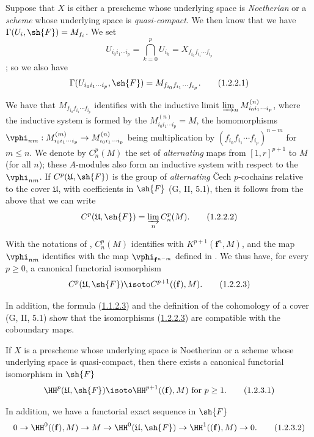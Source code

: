 \begin{env}[1.2.2]
\label{III.1.2.2}
Suppose that $X$ is either a prescheme whose underlying space is \emph{Noetherian} or a \emph{scheme} whose underlying space is \emph{quasi-compact}.
We then know  that we have $\Gamma(U_i,\sh{F})=M_{f_i}$.
We set
\[
  U_{i_0 i_1\cdots i_p}=\bigcap_{k=0}^p U_{i_k}=X_{f_{i_0}f_{i_1}\cdots f_{i_p}}
\]
; so we also have
\[
  \Gamma(U_{i_0 i_1\cdots i_p},\sh{F})=M_{f_{i_0}f_{i_1}\cdots f_{i_p}}.
  \tag{1.2.2.1}
\]

We have  that $M_{f_{i_0}f_{i_1}\cdots f_{i_p}}$ identifies with the inductive limit $\varinjlim_n M_{i_0 i_1\cdots i_p}^{(n)}$, where the inductive system is formed by the $M_{i_0 i_1\cdots i_p}^{(n)}=M$, the homomorphisms $\vphi_{nm}:M_{i_0 i_1\cdots i_p}^{(m)}\to M_{i_0 i_1\cdots i_p}^{(n)}$ being multiplication by $(f_{i_0}f_{i_1}\cdots f_{i_p})^{n-m}$ for $m\leq n$.
We denote by $C_n^p(M)$ the set of \emph{alternating} maps from $[1,r]^{p+1}$ to $M$ (for all $n$); these $A$-modules also form an inductive system with respect to the $\vphi_{nm}$.
If $C^p(\mathfrak{U},\sh{F})$ is the group of \emph{alternating} \v Cech $p$-cochains relative to the cover $\mathfrak{U}$, with coefficients in $\sh{F}$ (G, II, 5.1), then it follows from the above that we can write
\[
  C^p(\mathfrak{U},\sh{F})=\varinjlim_n C_n^p(M).
  \tag{1.2.2.2}
\]

With the notations of , $C_n^p(M)$ identifies with $K^{p+1}(\mathbf{f}^n,M)$, and the map $\vphi_{nm}$ identifies with the map $\vphi_{\mathbf{f}^{n-m}}$ defined in .
We thus have, for every $p\geq 0$, a canonical functorial isomorphism
\[
  C^p(\mathfrak{U},\sh{F})\isoto C^{p+1}((\mathbf{f}),M).
  \tag{1.2.2.3}\label{III.1.2.2.3}
\]

In addition, the formula (\hyperref[III.1.1.2.3]{1.1.2.3}) and the definition of the cohomology of a cover (G, II, 5.1) show that the isomorphisms (\hyperref[III.1.2.2.3]{1.2.2.3}) are compatible with the coboundary maps.
\end{env}

\begin{proposition}[1.2.3]
\label{III.1.2.3}
If $X$ is a prescheme whose underlying space is Noetherian or a scheme whose underlying space is quasi-compact, then there exists a canonical functorial isomorphism in $\sh{F}$
\[
  \HH^p(\mathfrak{U},\sh{F})\isoto\HH^{p+1}((\mathbf{f}),M)\text{ for }p\geq 1.
  \tag{1.2.3.1}\label{III.1.2.3.1}
\]

In addition, we have a functorial exact sequence in $\sh{F}$
\[
  0\to\HH^0((\mathbf{f}),M)\to M\to\HH^0(\mathfrak{U},\sh{F})\to\HH^1((\mathbf{f}),M)\to 0.
  \tag{1.2.3.2}\label{III.1.2.3.2}
\]
\end{proposition}

